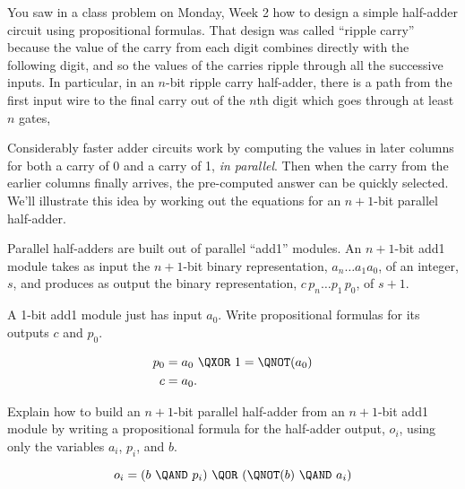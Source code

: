 \documentclass[handout]{mcs}
\begin{document}



\begin{problem}
  You saw in a class problem on Monday, Week 2 how to design a simple
  half-adder circuit using propositional formulas.  That design was called
  ``ripple carry'' because the value of the carry from each digit combines
  directly with the following digit, and so the values of the carries
  ripple through all the successive inputs.  In particular, in an $n$-bit
  ripple carry half-adder, there is a path from the first input wire to
  the final carry out of the $n$th digit which goes through at least $n$
  gates,

Considerably faster adder circuits work by computing the values in later
columns for both a carry of 0 and a carry of 1, \emph{in parallel}.  Then
when the carry from the earlier columns finally arrives, the pre-computed
answer can be quickly selected.  We'll illustrate this idea by working out
the equations for an $n+1$-bit parallel half-adder.

Parallel half-adders are built out of parallel ``add1'' modules.  An
$n+1$-bit add1 module takes as input the $n+1$-bit binary representation,
$a_n \dots a_1 a_0$, of an integer, $s$, and produces as output the binary
representation, $c\,p_n\dots p_1\,p_0$, of $s+1$.

\bparts

\ppart A 1-bit add1 module just has input $a_0$.  Write propositional
formulas for its outputs $c$ and $p_0$.

\begin{solution}

\begin{align}
p_0 & = a_0\ \QXOR\ 1 = \QNOT(a_0)\\
c & = a_0.
\end{align}

\end{solution}

\ppart Explain how to build an $n+1$-bit parallel half-adder from an
$n+1$-bit add1 module by writing a propositional formula for the
half-adder output, $o_i$, using only the variables $a_i$, $p_i$, and $b$.

\begin{solution}

\[
o_i  = (b\ \QAND\ p_i)\ \QOR\ (\QNOT(b)\ \QAND\ a_i)
\]


\end{solution}
\end{problem}
\end{document}
